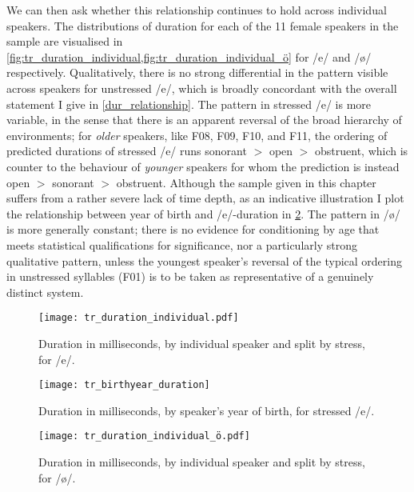 We can then ask whether this relationship continues to hold across individual speakers. The distributions of duration for each of the 11 female speakers in the sample are visualised in \cref{fig:tr_duration_individual,fig:tr_duration_individual_ö} for /e/ and /ø/ respectively. Qualitatively, there is no strong differential in the pattern visible across speakers for unstressed /e/, which is broadly concordant with the overall statement I give in \cref{dur_relationship}. The pattern in stressed /e/ is more variable, in the sense that there is an apparent reversal of the broad hierarchy of environments; for \emph{older} speakers, like F08, F09, F10, and F11, the ordering of predicted durations of stressed /e/ runs sonorant $>$ open $>$ obstruent, which is counter to the behaviour of \emph{younger} speakers for whom the prediction is instead open $>$ sonorant $>$ obstruent. Although the sample given in this chapter suffers from a rather severe lack of time depth, as an indicative illustration I plot the relationship between year of birth and /e/-duration in \cref{fig:tr_duration_e_birthyear}. The pattern in /ø/ is more generally constant; there is no evidence for conditioning by age that meets statistical qualifications for significance, nor a particularly strong qualitative pattern, unless the youngest speaker's reversal of the typical ordering in unstressed syllables (F01) is to be taken as representative of a genuinely distinct system.

\begin{figure}[H]
  \texttt{[image: tr\_duration\_individual.pdf]}
  \caption[Duration (ms) by individual speaker, for /e/.]{Duration in milliseconds, by individual speaker and split by stress, for /e/.}
  \label{fig:tr_duration_individual}
\end{figure}

\begin{figure}[H]
\centering
  \texttt{[image: tr\_birthyear\_duration]}
  \caption[Duration (ms) by year of birth of individual speakers, for stressed /e/.]{Duration in milliseconds, by speaker's year of birth, for stressed /e/.}
  \label{fig:tr_duration_e_birthyear}
\end{figure}

\begin{figure}[H]
  \texttt{[image: tr\_duration\_individual\_ö.pdf]}
  \caption[Duration (ms) by individual speaker, for /ø/.]{Duration in milliseconds, by individual speaker and split by stress, for /ø/.}
  \label{fig:tr_duration_individual_ö}
\end{figure}

